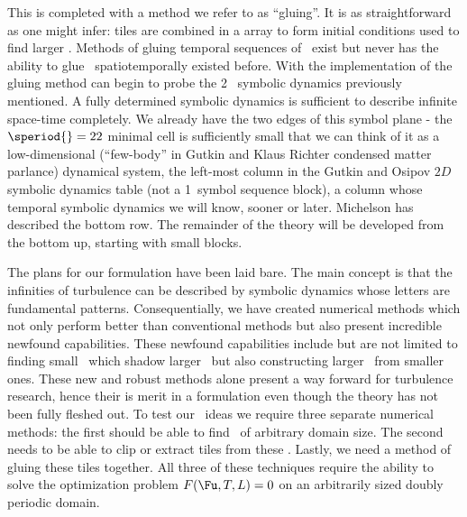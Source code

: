 This is completed with a method we refer to as ``gluing''. It is as straightforward as one
might infer: tiles are combined in a {\spt} array to form initial conditions used to find larger
\twots. Methods of gluing temporal sequences of \twots\ exist but never has the ability to
glue \twots\ spatiotemporally existed before.
With the implementation of the gluing method can begin to 
probe the 2\dmn\ {\spt} symbolic dynamics
previously mentioned. A fully determined symbolic dynamics is sufficient
to describe infinite space-time completely. 
We already have the two edges of this symbol plane - the $\speriod{}=22$ minimal
cell is sufficiently small that we can think of it as
a low-dimensional (``few-body'' in Gutkin and Klaus
Richter condensed matter parlance)
dynamical system, the left-most column in the Gutkin and
Osipov $2D$ symbolic dynamics {\spt} table (not a
1\dmn\ symbol sequence block), a column whose temporal symbolic dynamics
we will know, sooner or later. Michelson has described the
bottom row. The remainder of the theory will be developed from the
bottom up, starting with small {\spt} blocks.

The plans for our {\spt} formulation have been laid bare. The main concept is that the infinities
of turbulence can be described by {\spt} symbolic dynamics whose letters are fundamental {\spt}
patterns. Consequentially, we have created numerical methods which not only perform better than
conventional methods but also present incredible newfound capabilities. These newfound capabilities
include but are not limited to finding small \twots\ which shadow larger \twots\ but also constructing
larger \twots\ from smaller ones. These new and robust methods alone present a way forward for turbulence research, hence their is merit in a {\spt} formulation even though the theory has not
been fully fleshed out.
To test our \spt\ ideas we require three separate numerical methods: the first
should be able to find \twots\ of arbitrary domain size. The second needs to be able to
clip or extract tiles from these \twots. Lastly, we need a method of
gluing these tiles together. All three of these techniques require the ability
to solve the optimization problem $F(\Fu, T, L)=0$
on an arbitrarily sized doubly periodic domain.

